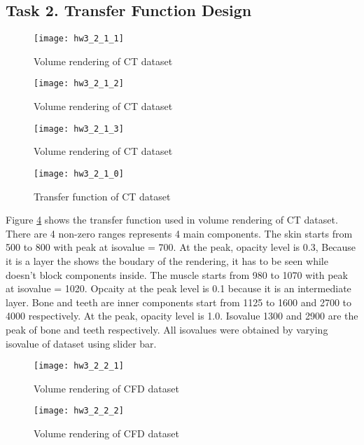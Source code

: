 \documentclass[11pt]{article}
\begin{document}
\subsection*{Task 2. Transfer Function Design}

\begin{figure}[H]
\centering
\texttt{[image: hw3\_2\_1\_1]}
\caption{Volume rendering of CT dataset}
\label{fig:hw3_2_1_1}
\end{figure}

\begin{figure}[H]
\centering
\texttt{[image: hw3\_2\_1\_2]}
\caption{Volume rendering of CT dataset}
\label{fig:hw3_2_1_2}
\end{figure}

\begin{figure}[H]
\centering
\texttt{[image: hw3\_2\_1\_3]}
\caption{Volume rendering of CT dataset}
\label{fig:hw3_2_1_3}
\end{figure}

\begin{figure}[H]
\centering
\texttt{[image: hw3\_2\_1\_0]}
\caption{Transfer function of CT dataset}
\label{fig:hw3_2_1_0}
\end{figure}

Figure \ref{fig:hw3_2_1_0} shows the transfer function used in volume rendering of CT dataset. There are 4 non-zero ranges represents 4 main components. 
The skin starts from 500 to 800 with peak at isovalue = 700. At the peak, opacity level is 0.3, Because it is a layer the shows the boudary of the rendering, it has to be seen while doesn't block components inside. 
The muscle starts from 980 to 1070 with peak at isovalue = 1020. Opcaity at the peak level is 0.1 because it is an intermediate layer.
Bone and teeth are inner components start from 1125 to 1600 and 2700 to 4000 respectively. At the peak, opacity level is 1.0. Isovalue 1300 and 2900 are the peak of bone and teeth respectively. All isovalues were obtained by varying isovalue of dataset using slider bar.

\begin{figure}[H]
\centering
\texttt{[image: hw3\_2\_2\_1]}
\caption{Volume rendering of CFD dataset}
\label{fig:hw3_2_2_1}
\end{figure}

\begin{figure}[H]
\centering
\texttt{[image: hw3\_2\_2\_2]}
\caption{Volume rendering of CFD dataset}
\label{fig:hw3_2_2_2}
\end{figure}
\end{document}
